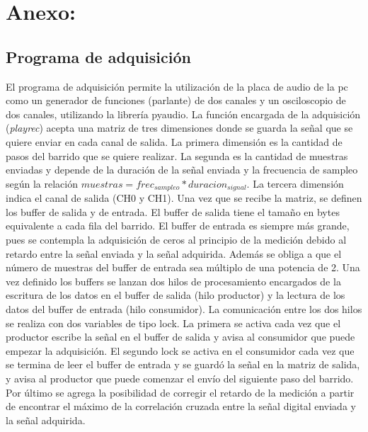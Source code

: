 \documentclass[a4paper, 11pt]{article}
\begin{document}
%
%

\section*{Anexo:}
\subsection*{Programa de adquisición}
El programa de adquisición permite la utilización de la placa de audio de la pc como un generador de funciones (parlante) de dos canales y un osciloscopio de dos canales, utilizando la librería pyaudio. La función encargada de la adquisición (\textit{playrec}) acepta una matriz de tres dimensiones donde se guarda la señal que se quiere enviar en cada canal de salida. La primera dimensión es la cantidad de pasos del barrido que se quiere realizar. La segunda es la cantidad de muestras enviadas y depende de la duración de la señal enviada y la frecuencia de sampleo según la relación $muestras=frec_{sampleo}*duracion_{signal}$. La tercera dimensión indica el canal de salida (CH0 y CH1).
Una vez que se recibe la matriz, se definen los buffer de salida y de entrada. El buffer de salida tiene el tamaño en bytes equivalente a cada fila del barrido. El buffer de entrada es siempre más grande, pues se contempla la adquisición de ceros al principio de la medición debido al retardo entre la señal enviada y la señal adquirida. Además se obliga a que el número de muestras del buffer de entrada sea múltiplo de una potencia de 2.
Una vez definido los buffers se lanzan dos hilos de procesamiento encargados de la escritura de los datos en el buffer de salida (hilo productor) y la lectura de los datos del buffer de entrada (hilo consumidor). La comunicación entre los dos hilos se realiza con dos variables de tipo lock. La primera se activa cada vez que el productor escribe la señal en el buffer de salida y avisa al consumidor que puede empezar la adquisición. El segundo lock se activa en el consumidor cada vez que se termina de leer el buffer de entrada y se guardó la señal en la matriz de salida, y avisa al productor que puede comenzar el envío del siguiente paso del barrido.
Por último se agrega la posibilidad de corregir el retardo de la medición a partir de encontrar el máximo de la correlación cruzada entre la señal digital enviada y la señal adquirida.
\end{document}
